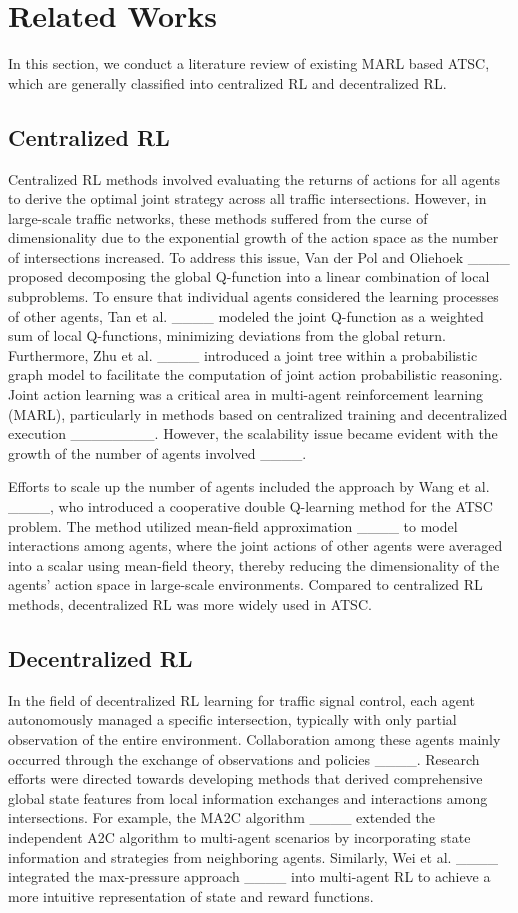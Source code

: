 \section{Related Works}
\label{S2}
In this section, we conduct a literature review of existing MARL based ATSC, which are generally classified into centralized RL and decentralized RL.
\subsection{Centralized RL}
Centralized RL methods involved evaluating the returns of actions for all agents to derive the optimal joint strategy across all traffic intersections. However, in large-scale traffic networks, these methods suffered from the curse of dimensionality due to the exponential growth of the action space as the number of intersections increased. To address this issue, Van der Pol and Oliehoek ____ proposed decomposing the global Q-function into a linear combination of local subproblems. To ensure that individual agents considered the learning processes of other agents, Tan et al. ____ modeled the joint Q-function as a weighted sum of local Q-functions, minimizing deviations from the global return. Furthermore, Zhu et al. ____ introduced a joint tree within a probabilistic graph model to facilitate the computation of joint action probabilistic reasoning. Joint action learning was a critical area in multi-agent reinforcement learning (MARL), particularly in methods based on centralized training and decentralized execution ________. However, the scalability issue became evident with the growth of the number of agents involved ____.

Efforts to scale up the number of agents included the approach by Wang et al. ____, who introduced a cooperative double Q-learning method for the ATSC problem. The method utilized mean-field approximation ____ to model interactions among agents, where the joint actions of other agents were averaged into a scalar using mean-field theory, thereby reducing the dimensionality of the agents' action space in large-scale environments. Compared to centralized RL methods, decentralized RL was more widely used in ATSC.

\subsection{Decentralized RL}
In the field of decentralized RL learning for traffic signal control, each agent autonomously managed a specific intersection, typically with only partial observation of the entire environment. Collaboration among these agents mainly occurred through the exchange of observations and policies ____. Research efforts were directed towards developing methods that derived comprehensive global state features from local information exchanges and interactions among intersections. For example, the MA2C algorithm ____ extended the independent A2C algorithm to multi-agent scenarios by incorporating state information and strategies from neighboring agents. Similarly, Wei et al. ____ integrated the max-pressure approach ____ into multi-agent RL to achieve a more intuitive representation of state and reward functions.

